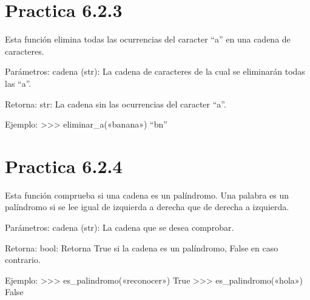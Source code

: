 \documentclass[letterpaper,10pt,spanish]{sphinxmanual}
\begin{document}
\section{Practica 6.2.3}
\label{\detokenize{pr6:module-pr6.2_3}}\label{\detokenize{pr6:practica-6-2-3}}

\begin{fulllineitems}
\label{\detokenize{pr6:pr6.2_3.eliminar_a}}
\pysigstartsignatures
{}
\pysigstopsignatures
\sphinxAtStartPar
Esta función elimina todas las ocurrencias del caracter “a” en una cadena de caracteres.

\sphinxAtStartPar
Parámetros:
cadena (str): La cadena de caracteres de la cual se eliminarán todas las “a”.

\sphinxAtStartPar
Retorna:
str: La cadena sin las ocurrencias del caracter “a”.

\sphinxAtStartPar
Ejemplo:
\textgreater{}\textgreater{}\textgreater{} eliminar\_a(«banana»)
“bn”

\end{fulllineitems}



\section{Practica 6.2.4}
\label{\detokenize{pr6:module-pr6.2_4}}\label{\detokenize{pr6:practica-6-2-4}}

\begin{fulllineitems}
\label{\detokenize{pr6:pr6.2_4.es_palindromo}}
\pysigstartsignatures
{}
\pysigstopsignatures
\sphinxAtStartPar
Esta función comprueba si una cadena es un palíndromo. Una palabra es un palíndromo si se lee
igual de izquierda a derecha que de derecha a izquierda.

\sphinxAtStartPar
Parámetros:
cadena (str): La cadena que se desea comprobar.

\sphinxAtStartPar
Retorna:
bool: Retorna True si la cadena es un palíndromo, False en caso contrario.

\sphinxAtStartPar
Ejemplo:
\textgreater{}\textgreater{}\textgreater{} es\_palindromo(«reconocer»)
True
\textgreater{}\textgreater{}\textgreater{} es\_palindromo(«hola»)
False

\end{fulllineitems}
\end{document}
